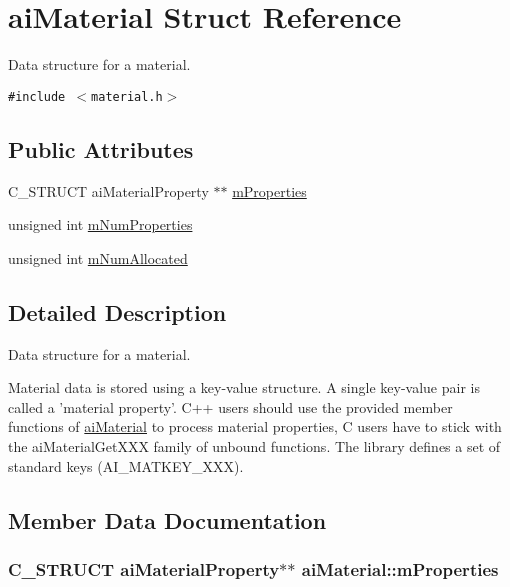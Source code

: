 \hypertarget{structai_material}{
\section{aiMaterial Struct Reference}
\label{structai_material}
}
Data structure for a material.  


{\tt \#include $<$material.h$>$}

\subsection*{Public Attributes}
\begin{CompactItemize}
\item 
C\_\-STRUCT aiMaterialProperty $\ast$$\ast$ \hyperlink{structai_material_f32b125d54bff5bc1fc54a1007487cab}{mProperties}
\item 
unsigned int \hyperlink{structai_material_243b07afdc6507f8878c93a2cafe4963}{mNumProperties}
\item 
unsigned int \hyperlink{structai_material_84a0016a263362c52b27a9d8d76dc449}{mNumAllocated}
\end{CompactItemize}


\subsection{Detailed Description}
Data structure for a material. 

Material data is stored using a key-value structure. A single key-value pair is called a 'material property'. C++ users should use the provided member functions of \hyperlink{structai_material}{aiMaterial} to process material properties, C users have to stick with the aiMaterialGetXXX family of unbound functions. The library defines a set of standard keys (AI\_\-MATKEY\_\-XXX). 

\subsection{Member Data Documentation}
\hypertarget{structai_material_f32b125d54bff5bc1fc54a1007487cab}{
\subsubsection[mProperties]{\setlength{\rightskip}{0pt plus 5cm}C\_\-STRUCT aiMaterialProperty$\ast$$\ast$ {\bf aiMaterial::mProperties}}}
\label{structai_material_f32b125d54bff5bc1fc54a1007487cab}


